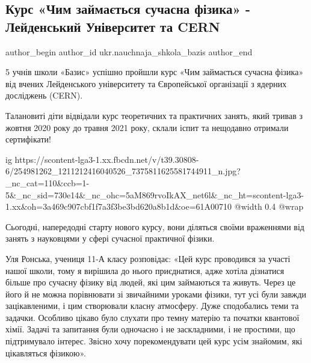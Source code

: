  
 
 
 
 
 
\subsection{Курс «Чим займається сучасна фізика» - Лейденський Університет та CERN}
\label{sec:08_11_2021.fb.ukr.nauchnaja_shkola_bazis.1.kurs_leiden_cern}
 
\ifcmt
 author_begin
   author_id ukr.nauchnaja_shkola_bazis
 author_end
\fi

5 учнів школи «Базис» успішно пройшли курс «Чим займається сучасна фізика» від
вчених Лейденського університету та Європейської організації з ядерних
досліджень (CERN). 

Талановиті діти відвідали курс теоретичних та практичних занять, який тривав з
жовтня 2020 року до травня 2021 року, склали іспит та нещодавно отримали
сертифікати!

\ifcmt
  ig https://scontent-lga3-1.xx.fbcdn.net/v/t39.30808-6/254981262_1211212416040526_7375811625581744911_n.jpg?_nc_cat=110&ccb=1-5&_nc_sid=730e14&_nc_ohc=5aM869rvoIkAX_net6l&_nc_ht=scontent-lga3-1.xx&oh=3a469c907cbf1f7a3f3be3bd620a8b1d&oe=61A00710
  @width 0.4
  @wrap 
\fi

Сьогодні, напередодні старту нового курсу, вони діляться своїми враженнями від
занять з науковцями у сфері сучасної практичної фізики.

Уля Ронська, учениця 11-А класу розповідає: «Цей курс проводився за участі
нашої школи, тому я вирішила до нього приєднатися, адже хотіла дізнатися більше
про сучасну фізику від людей, які цим займаються та живуть. Через це його й не
можна порівнювати зі звичайними уроками фізики, тут усі були завжди
зацікавленими, і цим створювали класну атмосферу. Дуже сподобались теми та
задачки. Особливо цікаво було слухати про темну матерію та початки квантової
хімії. Задачі та запитання були одночасно і не заскладними, і не простими, що
підтримувало інтерес. Звісно хочу порекомендувати цей курс усім знайомим, які
цікавляться фізикою». 

